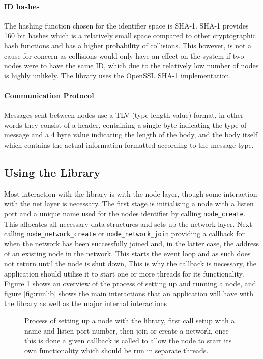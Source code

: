 \documentclass{article}
\begin{document}
\paragraph{ID hashes}
The hashing function chosen for the identifier space is SHA-1. SHA-1 provides 160 bit hashes which is a relatively small space compared to other cryptographic hash functions and has a higher probability of collisions. This however, is not a cause for concern as collisions would only have an effect on the system if two nodes were to have the same ID, which due to the relatively low number of nodes is highly unlikely.
The library uses the OpenSSL \cite{openssl} SHA-1 implementation.

\paragraph{Communication Protocol}
Messages sent between nodes use a TLV (type-length-value) format, in other words they consist of a header, containing a single byte indicating the type of message and a 4 byte value indicating the length of the body, and the body itself which contains the actual information formatted according to the message type.

\subsection{Using the Library}

Most interaction with the library is with the node layer, though some interaction with the net layer is necessary.
The first stage is initialising a node with a listen port and a unique name used for the nodes identifier by calling \texttt{node\_create}. This allocates all necessary data structures and sets up the network layer.
Next calling \texttt{node\_network\_create} or \texttt{node\_network\_join} providing a callback for when the network has been successfully joined and, in the latter case, the address of an existing node in the network.
This starts the event loop and as such does not return until the node is shut down, This is why the callback is necessary, the application should utilise it to start one or more threads for its functionality.
Figure \ref{fig:startlib} shows an overview of the process of setting up and running a node, and figure \ref{fig:runlib} shows the main interactions that an application will have with the library as well as the major internal interactions

\begin{figure}
\centering
\def\svgwidth{\columnwidth}

\caption{Process of setting up a node with the library, first call setup with a name and listen port number, then join or create a network, once this is done a given callback is called to allow the node to start its own functionality which should be run in separate threads.}
\label{fig:startlib}
\end{figure}
\end{document}
